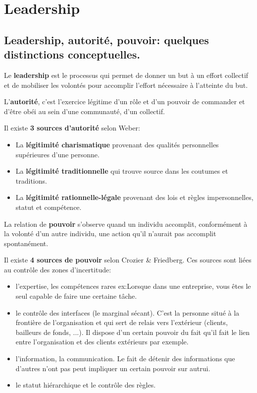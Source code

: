 \documentclass[12pt]{article}
\begin{document}
\section{Leadership}
	
	\subsection{Leadership, autorité, pouvoir: quelques distinctions conceptuelles.}
	Le \textbf{leadership} est le processus qui permet de donner un but à un effort collectif et de mobiliser les volontés pour accomplir l'effort nécessaire à l'atteinte du but. \newline
	
	L'\textbf{autorité}, c'est l'exercice légitime d'un rôle et d'un pouvoir de commander et d'être obéi au sein d'une communauté, d'un collectif. \newline
	
	Il existe \textbf{3 sources d'autorité} selon Weber:
	\begin{itemize}
	\item La \textbf{légitimité charismatique} provenant des qualités personnelles supérieures d'une personne.
	\item La \textbf{légitimité traditionnelle} qui trouve source dans les coutumes et traditions.
	\item La \textbf{légitimité rationnelle-légale} provenant des lois et règles impersonnelles, statut et compétence. \newline
	\end{itemize}
	
	La relation de \textbf{pouvoir} s'observe quand un individu accomplit, conformément à la volonté d'un autre individu, une action qu'il n'aurait pas accomplit spontanément. \newline
	
	Il existe \textbf{4 sources de pouvoir} selon Crozier \& Friedberg. Ces sources sont liées au contrôle des zones d'incertitude:
	\begin{itemize}
	\item l'expertise, les compétences rares \newline
	ex:Lorsque dans une entreprise, vous êtes le seul capable de faire une certaine tâche.
	\item le contrôle des interfaces (le marginal sécant). C'est la personne situé à la frontière de l'organisation et qui sert de relais vers l'extérieur (clients, bailleurs de fonds, ...). Il dispose d'un certain pouvoir du fait qu'il fait le lien entre l'organisation et des clients extérieurs par exemple.
	\item l'information, la communication. Le fait de détenir des informations que d'autres n'ont pas peut impliquer un certain pouvoir sur autrui.
	\item le statut hiérarchique et le contrôle des règles. \newline
	\end{itemize}
	
\end{document}
